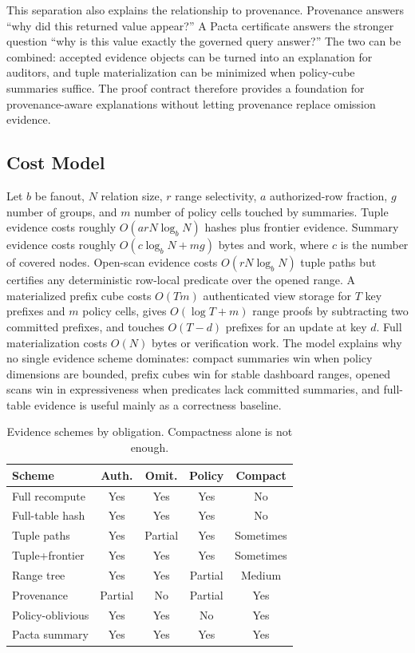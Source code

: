 \documentclass[conference]{IEEEtran}
\newcommand{\sys}{Pacta\xspace}
\begin{document}
This separation also explains the relationship to provenance. Provenance answers ``why did this returned value appear?'' A \sys certificate answers the stronger question ``why is this value exactly the governed query answer?'' The two can be combined: accepted evidence objects can be turned into an explanation for auditors, and tuple materialization can be minimized when policy-cube summaries suffice. The proof contract therefore provides a foundation for provenance-aware explanations without letting provenance replace omission evidence.

\subsection{Cost Model}
Let $b$ be fanout, $N$ relation size, $r$ range selectivity, $a$ authorized-row fraction, $g$ number of groups, and $m$ number of policy cells touched by summaries. Tuple evidence costs roughly $O(a r N\log_b N)$ hashes plus frontier evidence. Summary evidence costs roughly $O(c\log_b N + mg)$ bytes and work, where $c$ is the number of covered nodes. Open-scan evidence costs $O(rN\log_b N)$ tuple paths but certifies any deterministic row-local predicate over the opened range. A materialized prefix cube costs $O(Tm)$ authenticated view storage for $T$ key prefixes and $m$ policy cells, gives $O(\log T+m)$ range proofs by subtracting two committed prefixes, and touches $O(T-d)$ prefixes for an update at key $d$. Full materialization costs $O(N)$ bytes or verification work. The model explains why no single evidence scheme dominates: compact summaries win when policy dimensions are bounded, prefix cubes win for stable dashboard ranges, opened scans win in expressiveness when predicates lack committed summaries, and full-table evidence is useful mainly as a correctness baseline.

\begin{table}[t]
\centering
\caption{Evidence schemes by obligation. Compactness alone is not enough.}
\label{tab:contracts}
\scriptsize
{\setlength{\tabcolsep}{3pt}
\begin{tabular}{@{}lcccc@{}}
\toprule
Scheme & Auth. & Omit. & Policy & Compact \\
\midrule
Full recompute & Yes & Yes & Yes & No \\
Full-table hash & Yes & Yes & Yes & No \\
Tuple paths & Yes & Partial & Yes & Sometimes \\
Tuple+frontier & Yes & Yes & Yes & Sometimes \\
Range tree & Yes & Yes & Partial & Medium \\
Provenance & Partial & No & Partial & Yes \\
Policy-oblivious & Yes & Yes & No & Yes \\
\sys summary & Yes & Yes & Yes & Yes \\
\bottomrule
\end{tabular}
}
\end{table}
\end{document}
